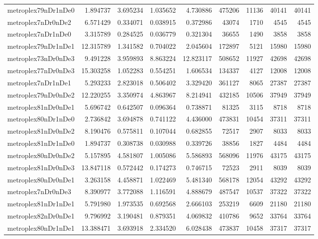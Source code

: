 \begin{longtable}{|l|r|r|r|r|r|r|r|r|}
metroplex79nDr1nDe0 & 1.894737 & 3.695234 & 1.035652 & 4.730886 & 475206 & 11136 & 40141 & 40141 \\
metroplex7nDr0nDe2 & 6.571429 & 0.334071 & 0.038915 & 0.372986 & 43074 & 1710 & 4545 & 4545 \\
metroplex7nDr1nDe0 & 3.315789 & 0.284525 & 0.036779 & 0.321304 & 36655 & 1490 & 3858 & 3858 \\
metroplex79nDr1nDe1 & 12.315789 & 1.341582 & 0.704022 & 2.045604 & 172897 & 5121 & 15980 & 15980 \\
metroplex73nDr0nDe3 & 9.491228 & 3.959893 & 8.863224 & 12.823117 & 508652 & 11927 & 42698 & 42698 \\
metroplex77nDr0nDe3 & 15.303258 & 1.052283 & 0.554251 & 1.606534 & 134337 & 4127 & 12008 & 12008 \\
metroplex7nDr1nDe1 & 5.293233 & 2.823018 & 0.506402 & 3.329420 & 361127 & 8065 & 27387 & 27387 \\
metroplex79nDr0nDe2 & 12.220255 & 3.350974 & 4.863967 & 8.214941 & 432185 & 10506 & 37949 & 37949 \\
metroplex81nDr0nDe1 & 5.696742 & 0.642507 & 0.096364 & 0.738871 & 81325 & 3115 & 8718 & 8718 \\
metroplex80nDr1nDe0 & 2.736842 & 3.694878 & 0.741122 & 4.436000 & 473831 & 10454 & 37311 & 37311 \\
metroplex81nDr0nDe2 & 8.190476 & 0.575811 & 0.107044 & 0.682855 & 72517 & 2907 & 8033 & 8033 \\
metroplex81nDr1nDe0 & 1.894737 & 0.308738 & 0.030988 & 0.339726 & 38856 & 1827 & 4484 & 4484 \\
metroplex80nDr0nDe2 & 5.157895 & 4.581807 & 1.005086 & 5.586893 & 568096 & 11976 & 43175 & 43175 \\
metroplex81nDr0nDe3 & 13.847118 & 0.572442 & 0.174273 & 0.746715 & 72523 & 2911 & 8039 & 8039 \\
metroplex80nDr0nDe1 & 3.263158 & 4.458871 & 1.022469 & 5.481340 & 568178 & 12054 & 43292 & 43292 \\
metroplex7nDr0nDe3 & 8.390977 & 3.772088 & 1.116591 & 4.888679 & 487547 & 10537 & 37322 & 37322 \\
metroplex81nDr1nDe1 & 5.791980 & 1.973535 & 0.692568 & 2.666103 & 253219 & 6609 & 21180 & 21180 \\
metroplex82nDr0nDe1 & 9.796992 & 3.190481 & 0.879351 & 4.069832 & 410786 & 9652 & 33764 & 33764 \\
metroplex80nDr1nDe1 & 13.388471 & 3.693918 & 2.334520 & 6.028438 & 473837 & 10458 & 37317 & 37317 \\

\end{longtable}
